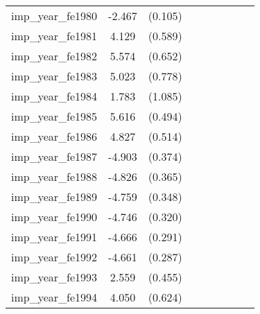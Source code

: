 {\begin{tabular}{l*{4}{cc}}
imp\_year\_fe1980&   -2.467\sym{***}&  (0.105)&                  &         &                  &         &                  &         \\
imp\_year\_fe1981&    4.129\sym{***}&  (0.589)&                  &         &                  &         &                  &         \\
imp\_year\_fe1982&    5.574\sym{***}&  (0.652)&                  &         &                  &         &                  &         \\
imp\_year\_fe1983&    5.023\sym{***}&  (0.778)&                  &         &                  &         &                  &         \\
imp\_year\_fe1984&    1.783         &  (1.085)&                  &         &                  &         &                  &         \\
imp\_year\_fe1985&    5.616\sym{***}&  (0.494)&                  &         &                  &         &                  &         \\
imp\_year\_fe1986&    4.827\sym{***}&  (0.514)&                  &         &                  &         &                  &         \\
imp\_year\_fe1987&   -4.903\sym{***}&  (0.374)&                  &         &                  &         &                  &         \\
imp\_year\_fe1988&   -4.826\sym{***}&  (0.365)&                  &         &                  &         &                  &         \\
imp\_year\_fe1989&   -4.759\sym{***}&  (0.348)&                  &         &                  &         &                  &         \\
imp\_year\_fe1990&   -4.746\sym{***}&  (0.320)&                  &         &                  &         &                  &         \\
imp\_year\_fe1991&   -4.666\sym{***}&  (0.291)&                  &         &                  &         &                  &         \\
imp\_year\_fe1992&   -4.661\sym{***}&  (0.287)&                  &         &                  &         &                  &         \\
imp\_year\_fe1993&    2.559\sym{***}&  (0.455)&                  &         &                  &         &                  &         \\
imp\_year\_fe1994&    4.050\sym{***}&  (0.624)&                  &         &                  &         &                  &         \\

\end{tabular}}
